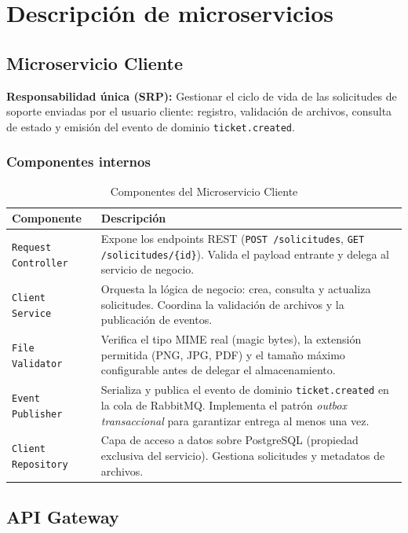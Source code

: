 \documentclass[12pt,a4paper]{article}
\begin{document}
\section{Descripción de microservicios}

\subsection{Microservicio Cliente}
\textbf{Responsabilidad única (SRP):}
  Gestionar el ciclo de vida de las solicitudes de soporte enviadas por el usuario
  cliente: registro, validación de archivos, consulta de estado y emisión del evento
  de dominio \texttt{ticket.created}.


\subsubsection{Componentes internos}

\begin{table}[H]
\centering
\caption{Componentes del Microservicio Cliente}
\begin{tabularx}{\textwidth}{lX}
\toprule
\textbf{Componente} & \textbf{Descripción} \\
\midrule
\texttt{Request Controller}
  & Expone los endpoints REST (\texttt{POST /solicitudes},
    \texttt{GET /solicitudes/\{id\}}). Valida el payload
    entrante y delega al servicio de negocio. \\
\texttt{Client Service}
  & Orquesta la lógica de negocio: crea, consulta y actualiza
    solicitudes. Coordina la validación de archivos y la
    publicación de eventos. \\
\texttt{File Validator}
  & Verifica el tipo MIME real (magic bytes), la extensión
    permitida (PNG, JPG, PDF) y el tamaño máximo configurable
    antes de delegar el almacenamiento. \\
\texttt{Event Publisher}
  & Serializa y publica el evento de dominio
    \texttt{ticket.created} en la cola de RabbitMQ.
    Implementa el patrón \emph{outbox transaccional} para
    garantizar entrega al menos una vez. \\
\texttt{Client Repository}
  & Capa de acceso a datos sobre PostgreSQL (propiedad
    exclusiva del servicio). Gestiona solicitudes y metadatos
    de archivos. \\
\bottomrule
\end{tabularx}
\end{table}

\subsection{API Gateway}
\end{document}
